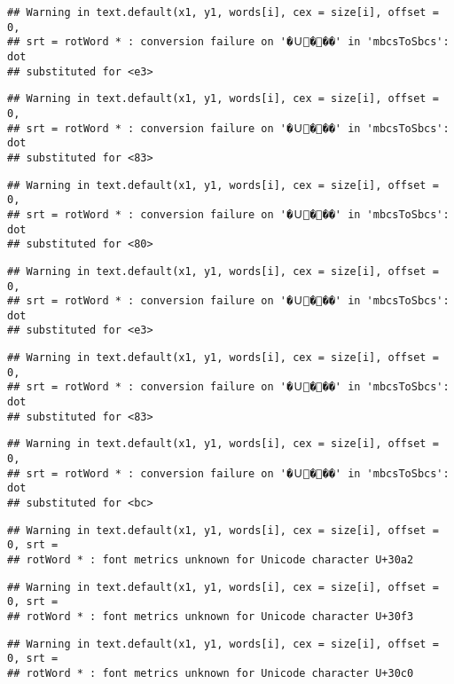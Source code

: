 \documentclass[]{article}
\begin{document}
\begin{verbatim}
## Warning in text.default(x1, y1, words[i], cex = size[i], offset = 0,
## srt = rotWord * : conversion failure on '�Ｕ���' in 'mbcsToSbcs': dot
## substituted for <e3>
\end{verbatim}

\begin{verbatim}
## Warning in text.default(x1, y1, words[i], cex = size[i], offset = 0,
## srt = rotWord * : conversion failure on '�Ｕ���' in 'mbcsToSbcs': dot
## substituted for <83>
\end{verbatim}

\begin{verbatim}
## Warning in text.default(x1, y1, words[i], cex = size[i], offset = 0,
## srt = rotWord * : conversion failure on '�Ｕ���' in 'mbcsToSbcs': dot
## substituted for <80>
\end{verbatim}

\begin{verbatim}
## Warning in text.default(x1, y1, words[i], cex = size[i], offset = 0,
## srt = rotWord * : conversion failure on '�Ｕ���' in 'mbcsToSbcs': dot
## substituted for <e3>
\end{verbatim}

\begin{verbatim}
## Warning in text.default(x1, y1, words[i], cex = size[i], offset = 0,
## srt = rotWord * : conversion failure on '�Ｕ���' in 'mbcsToSbcs': dot
## substituted for <83>
\end{verbatim}

\begin{verbatim}
## Warning in text.default(x1, y1, words[i], cex = size[i], offset = 0,
## srt = rotWord * : conversion failure on '�Ｕ���' in 'mbcsToSbcs': dot
## substituted for <bc>
\end{verbatim}

\begin{verbatim}
## Warning in text.default(x1, y1, words[i], cex = size[i], offset = 0, srt =
## rotWord * : font metrics unknown for Unicode character U+30a2
\end{verbatim}

\begin{verbatim}
## Warning in text.default(x1, y1, words[i], cex = size[i], offset = 0, srt =
## rotWord * : font metrics unknown for Unicode character U+30f3
\end{verbatim}

\begin{verbatim}
## Warning in text.default(x1, y1, words[i], cex = size[i], offset = 0, srt =
## rotWord * : font metrics unknown for Unicode character U+30c0
\end{verbatim}
\end{document}
